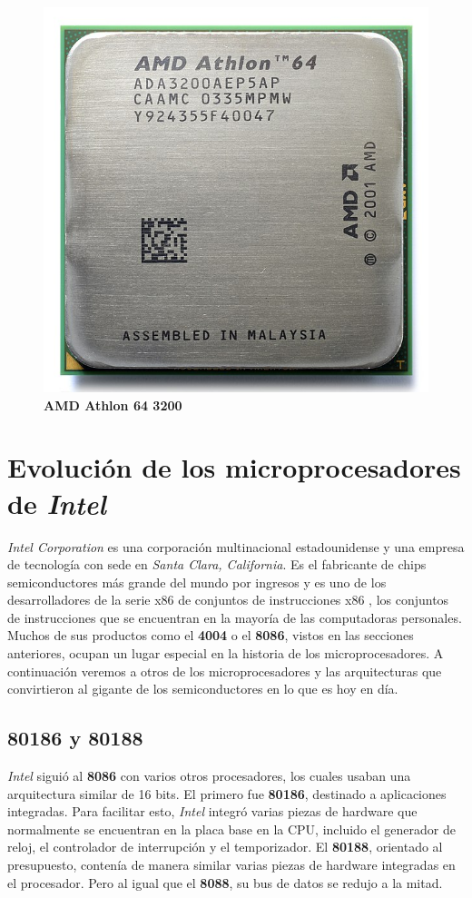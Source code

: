 \begin{figure}[htb]
	\centering
	\includegraphics[scale = 0.15]{Graphics/AMD_Athlon_64_3200+_ADA3200AEP5AP.jpg}
	\caption{\textbf{AMD Athlon 64 3200}}
	\label{fig:19}
\end{figure}

\section{Evolución de los microprocesadores de \emph{Intel}}
\emph{Intel Corporation} es una corporación multinacional estadounidense y una empresa de tecnología con sede en \emph{Santa Clara, California}. 
Es el fabricante de chips semiconductores más grande del mundo por ingresos y es uno de los desarrolladores de la serie x86 
de conjuntos de instrucciones x86 , los conjuntos de instrucciones que se encuentran en la mayoría de las 
computadoras personales. Muchos de sus productos como el \textbf{4004} o el \textbf{8086}, vistos en las secciones anteriores, ocupan un lugar especial 
en la historia de los microprocesadores. A continuación veremos a otros de los microprocesadores y las arquitecturas que convirtieron 
al gigante de los semiconductores en lo que es hoy en día.\

\subsection{\textbf{80186} y \textbf{80188}}
\emph{Intel} siguió al \textbf{8086} con varios otros procesadores, los cuales usaban una arquitectura similar de 16 bits. El primero fue \textbf{80186}, 
destinado a aplicaciones integradas. Para facilitar esto, \emph{Intel} integró varias piezas de hardware que normalmente se encuentran en la 
placa base en la CPU, incluido el generador de reloj, el controlador de interrupción y el temporizador. El \textbf{80188}, orientado al presupuesto, 
contenía de manera similar varias piezas de hardware integradas en el procesador. Pero al igual que el \textbf{8088}, su bus de datos se redujo a la 
mitad.

